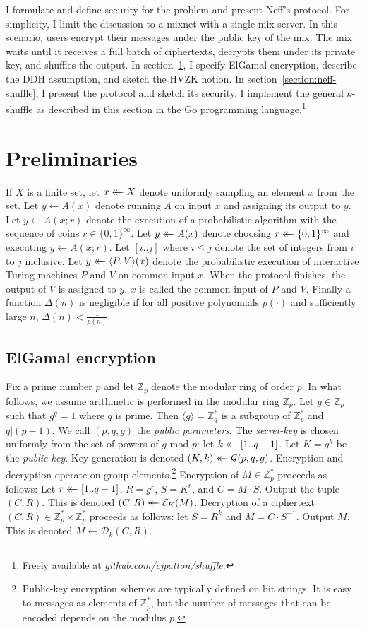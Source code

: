 \documentclass[letter]{article}
\newcounter{foot}
\newcommand{\Zmodp}{\mathbb{Z}_p}
\newcommand{\Zmodq}{\mathbb{Z}_q}
\newcommand{\bits}{\{0,1\}}
\newcommand*\by{\times}
\newcommand{\getsr}{\mathrel{\leftarrow\mkern-14mu\leftarrow}}
\newcommand{\brackets}[1]{\langle #1 \rangle}
\newcommand{\pk}{K}
\newcommand{\sk}{k}
\newcommand{\gen}{\mathcal{G}}
\newcommand{\enc}{\mathcal{E}}
\newcommand{\dec}{\mathcal{D}}
\begin{document}
I formulate and define security for the problem and present Neff's protocol.
For simplicity, I limit the discussion to a mixnet with a single mix server. In
this scenario, users encrypt their messages under the public key of the mix. The
mix waits until it receives a full batch of ciphertexts, decrypts them under its
private key, and shuffles the output. In section~\ref{section:prelim}, I specify
ElGamal encryption, describe the DDH assumption, and sketch the HVZK notion. In
section~\ref{section:neff-shuffle}, I present the protocol and sketch its
security. I implement the general $k$-shuffle as described in this section in
the Go programming language.\footnote{ Freely available at {\it
github.com/cjpatton/shuffle}.}

\section{Preliminaries} \label{section:prelim}

If $X$ is a finite set, let $x \getsr X$ denote uniformly sampling an
element $x$ from the set. Let $y \gets A(x)$ denote running $A$ on input $x$ and
assigning its output to $y$. Let $y \gets A(x; r)$ denote the execution of a
probabilistic algorithm with the sequence of coins $r \in \bits^\infty$. Let $y
\getsr A(x)$ denote choosing $r \getsr \bits^\infty$ and executing $y \gets
A(x; r)$. Let $[i..j]$ where $i \le j$ denote the set of integers from $i$ to
$j$ inclusive.
Let $y \getsr \brackets{P, V}(x)$ denote the probabilistic execution of
interactive Turing machines $P$ and $V$ on common input $x$. When the protocol
finishes, the output of $V$ is assigned to $y$.
$x$ is called the common input of $P$ and $V$.
Finally a function $\Delta(n)$ is
negligible if for all positive polynomials
$p(\cdot)$ and sufficiently large $n$, $\Delta(n) < \frac{1}{p(n)}$.


\subsection{ElGamal encryption}

Fix a prime number $p$ and let $\Zmodp$ denote the modular ring of order $p$.
In what follows, we assume arithmetic is performed in the modular ring $\Zmodp$.
Let $g \in \Zmodp$ such that $g^q = 1$ where $q$ is prime. Then $\brackets{g} =
\Zmodq^*$ is a subgroup of $\Zmodp^*$ and $q | (p-1)$. We call $(p, q, g)$ the
\textit{public parameters}. The \textit{secret-key} is chosen uniformly from
the set of powers of $g$ mod $p$: let $\sk \getsr [1..q-1]$. Let $\pk = g^\sk$ be
the \textit{public-key}. Key generation is denoted $(K, k) \getsr \gen(p, q,
g)$.
Encryption and decryption operate on group elements.\footnote{
Public-key encryption schemes are typically defined on bit
strings. It is easy to messages as elements of $\Zmodp^*$, but the number of
messages that can be encoded depends on the modulus $p$.}
Encryption of $M \in \Zmodp^*$ proceeds as follows:
Let $r \getsr [1..q-1]$,
$R = g^r$,
$S = K^r$, and
$C = M \cdot S$.
Output the tuple $(C, R)$.
This is denoted $(C, R) \getsr \enc_K(M)$.
Decryption of a ciphertext $(C, R) \in \Zmodp^* \by \Zmodp^*$ proceeds as follows:
let $S = R^\sk$ and
$M = C \cdot S^{-1}$.
Output $M$.
This is denoted $M \gets \dec_k(C, R)$.
\end{document}
